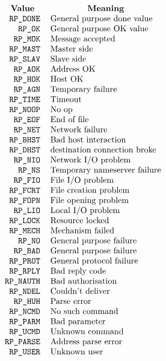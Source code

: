 \[\begin{tabular}{r  l}
	\multicolumn{1}{c}{\bf Value}&
		\multicolumn{1}{c}{\bf Meaning}\\
	\tt RP\_DONE	     &	General purpose done value \\
	\tt RP\_OK	     &	General purpose OK value \\
	\tt RP\_MOK	     &	Message accepted \\
	\tt RP\_MAST	     &	Master side \\
	\tt RP\_SLAV	     &	Slave side\\
	\tt RP\_AOK	     &	Address OK \\
	\tt RP\_HOK	     &	Host OK \\
	\tt RP\_AGN	     &	Temporary failure\\
	\tt RP\_TIME	     &	Timeout\\
	\tt RP\_NOOP	     &	No op\\
	\tt RP\_EOF	     &	End of file\\
	\tt RP\_NET	     &	Network failure\\
	\tt RP\_BHST	     &	Bad host interaction\\
	\tt RP\_DHST	     &	destination connection broke\\
	\tt RP\_NIO	     &	Network I/O problem\\
	\tt RP\_NS	     &	Temporary nameserver failure\\
	\tt RP\_FIO	     &	File I/O problem\\
	\tt RP\_FCRT	     &	File creation problem\\
	\tt RP\_FOPN	     &	File opening problem\\
	\tt RP\_LIO	     &	Local I/O problem\\
	\tt RP\_LOCK	     &	Resource locked\\
	\tt RP\_MECH	     &	Mechanism failed\\
	\tt RP\_NO	     &	General purpose failure\\
	\tt RP\_BAD	     &	General purpose failure\\
	\tt RP\_PROT	     &	General protocol failure\\
	\tt RP\_RPLY	     &	Bad reply code\\
	\tt RP\_NAUTH	     &	Bad authorisation\\
	\tt RP\_NDEL	     &	Couldn't deliver\\
	\tt RP\_HUH	     &	Parse error\\
	\tt RP\_NCMD	     &	No such command\\
	\tt RP\_PARM	     &	Bad parameter\\
	\tt RP\_UCMD	     &	Unknown command\\
	\tt RP\_PARSE	     &	Address parse error\\
	\tt RP\_USER	     &	Unknown user\\
\end{tabular}\]
